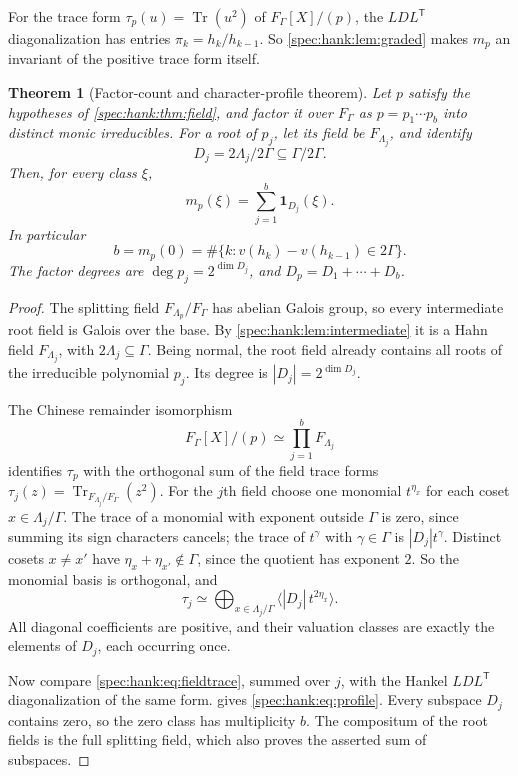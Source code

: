 \documentclass[11pt,a4paper]{article}
\numberwithin{equation}{section}
\newtheorem{theorem}{Theorem}[section]
\theoremstyle{definition}
\theoremstyle{remark}
\newcommand{\Tr}{\operatorname{Tr}}
\begin{document}
For the trace form $\tau_p(u)=\Tr(u^2)$ of $F_\Gamma[X]/(p)$, the
$LDL^{\mathsf T}$ diagonalization has entries $\pi_k=h_k/h_{k-1}$. So
\cref{spec:hank:lem:graded} makes $m_p$ an invariant of the positive trace
form itself.

\begin{theorem}[Factor-count and character-profile theorem]
\label{spec:hank:thm:profile}
Let $p$ satisfy the hypotheses of \cref{spec:hank:thm:field}, and factor it
over $F_\Gamma$ as $p=p_1\cdots p_b$ into distinct monic irreducibles. For a
root of $p_j$, let its field be $F_{\Lambda_j}$, and identify
\[
 D_j=2\Lambda_j/2\Gamma\subseteq\Gamma/2\Gamma.
\]
Then, for every class $\xi$,
\begin{equation}\label{spec:hank:eq:profile}
 m_p(\xi)=\sum_{j=1}^b\mathbf 1_{D_j}(\xi).
\end{equation}
In particular
\begin{equation}\label{spec:hank:eq:factorcount}
 b=m_p(0)
   =\#\{k:v(h_k)-v(h_{k-1})\in2\Gamma\}.
\end{equation}
The factor degrees are $\deg p_j=2^{\dim D_j}$, and $D_p=D_1+\cdots+D_b$.
\end{theorem}
\begin{proof}
The splitting field $F_{\Lambda_p}/F_\Gamma$ has abelian Galois group, so every
intermediate root field is Galois over the base. By
\cref{spec:hank:lem:intermediate} it is a Hahn field $F_{\Lambda_j}$, with
$2\Lambda_j\subseteq\Gamma$. Being normal, the root field already contains all
roots of the irreducible polynomial $p_j$. Its degree is
$|D_j|=2^{\dim D_j}$.

The Chinese remainder isomorphism
\[
 F_\Gamma[X]/(p)\simeq\prod_{j=1}^b F_{\Lambda_j}
\]
identifies $\tau_p$ with the orthogonal sum of the field trace forms
$\tau_j(z)=\Tr_{F_{\Lambda_j}/F_\Gamma}(z^2)$. For the $j$th field choose one
monomial $t^{\eta_x}$ for each coset $x\in\Lambda_j/\Gamma$. The trace of a
monomial with exponent outside $\Gamma$ is zero, since summing its sign
characters cancels; the trace of $t^\gamma$ with $\gamma\in\Gamma$ is
$|D_j|t^\gamma$. Distinct cosets $x\ne x'$ have $\eta_x+\eta_{x'}\notin\Gamma$,
since the quotient has exponent $2$. So the monomial basis is orthogonal, and
\begin{equation}\label{spec:hank:eq:fieldtrace}
 \tau_j\simeq
 \bigoplus_{x\in\Lambda_j/\Gamma}\bigl\langle |D_j|\,t^{2\eta_x}\bigr\rangle.
\end{equation}
All diagonal coefficients are positive, and their valuation classes are
exactly the elements of $D_j$, each occurring once.

Now compare \eqref{spec:hank:eq:fieldtrace}, summed over $j$, with the Hankel
$LDL^{\mathsf T}$ diagonalization of the same form.
 gives \eqref{spec:hank:eq:profile}. Every subspace
$D_j$ contains zero, so the zero class has multiplicity $b$. The compositum of
the root fields is the full splitting field, which also proves the asserted
sum of subspaces.
\end{proof}
\end{document}
